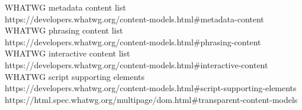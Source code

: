 \documentclass[conference]{IEEEtran}
\begin{document}
\begin{thebibliography}{1}
  WHATWG metadata content list\\
  https://developers.whatwg.org/content-models.html\#metadata-content
  WHATWG phrasing content list\\
  https://developers.whatwg.org/content-models.html\#phrasing-content
  WHATWG interactive content list\\
  https://developers.whatwg.org/content-models.html\#interactive-content
  WHATWG script supporting elements\\
  https://developers.whatwg.org/content-models.html\#script-supporting-elements
  https://html.spec.whatwg.org/multipage/dom.html\#transparent-content-models

\end{thebibliography}

\end{document}
